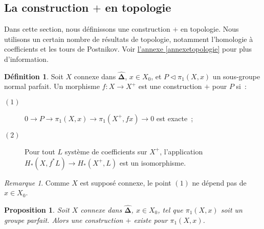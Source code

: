 \documentclass{amsart}
\newcommand{\sref}[2]{\hyperref[#2]{#1 \ref*{#2}}}
\theoremstyle{plain}
\newtheorem{prop}[theo]{Proposition}
\theoremstyle{definition}
\newtheorem{defi}[theo]{Définition}
\theoremstyle{remark}
\newtheorem{rem}[theo]{Remarque}
\newcommand{\DEns}{\widehat{\mathbf{\Delta}}}
\newcommand{\ra}{\rightarrow}
\begin{document}
\subsection{\texorpdfstring{La construction $+$ en topologie}{La construction + en topologie}}

Dans cette section, nous définissons une construction $+$ en topologie. Nous utilisons un certain nombre de résultats
de topologie, notamment l'homologie à coefficients et les tours de Postnikov.
Voir \sref{l'annexe}{annexetopologie} pour plus d'information.

\begin{defi}
  Soit $X$ connexe dans $\DEns$, $x\in X_0$, et $P\triangleleft \pi_1(X,x)$ un sous-groupe normal parfait.
  Un morphisme $f:X\ra X^+$ est une construction $+$ pour $P$ si~:
  \begin{description}
    \item[$(1)$] $0\ra P\ra \pi_1(X,x) \ra \pi_1(X^+,fx)\ra 0$ est exacte~;
    \item[$(2)$] Pour tout $L$ système de coefficients sur $X^+$, l'application $H_*(X,f^*L)\ra H_*(X^+,L)$ est un isomorphisme.
  \end{description}
\end{defi}

\begin{rem}
  Comme $X$ est supposé connexe, le point $(1)$ ne dépend pas de $x\in X_0$.
\end{rem}

\begin{prop}
  Soit $X$ connexe dans $\DEns$, $x\in X_0$, tel que $\pi_1(X,x)$ soit un groupe parfait. Alors une construction $+$ existe pour $\pi_1(X,x)$.
\end{prop}
\end{document}
